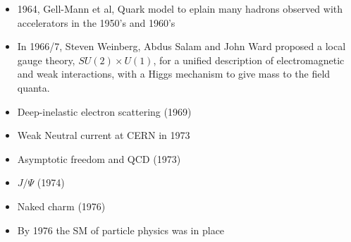 \begin{itemize}
    \item 1964, Gell-Mann et al, Quark model to eplain many hadrons observed 
	with accelerators in the 1950's and 1960's
    \item In 1966/7, Steven Weinberg, Abdus Salam and John Ward proposed a local gauge theory, $SU(2) \times U(1)$, for a unified description of electromagnetic and weak interactions, with a Higgs mechanism to give mass to the field quanta.
    \item Deep-inelastic electron scattering (1969)
    \item Weak Neutral current at CERN in 1973
    \item Asymptotic freedom and QCD (1973)
    \item $J/\Psi$ (1974)
    \item Naked charm (1976)
    \item By 1976 the SM of particle physics was in place
\end{itemize}
